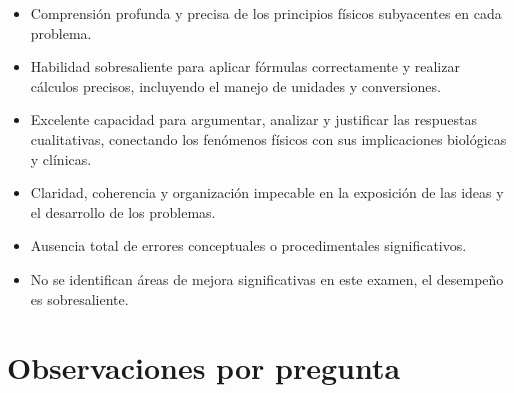\documentclass[11pt,a4paper]{article}
\begin{document}
\vspace{4pt}
\begin{minipage}[t]{0.48\linewidth}
  \begin{tcolorbox}[cajaFortaleza, title={Fortalezas}]
\begin{itemize}[leftmargin=1.5em, itemsep=2pt]
  \item Comprensión profunda y precisa de los principios físicos subyacentes en cada problema.
  \item Habilidad sobresaliente para aplicar fórmulas correctamente y realizar cálculos precisos, incluyendo el manejo de unidades y conversiones.
  \item Excelente capacidad para argumentar, analizar y justificar las respuestas cualitativas, conectando los fenómenos físicos con sus implicaciones biológicas y clínicas.
  \item Claridad, coherencia y organización impecable en la exposición de las ideas y el desarrollo de los problemas.
  \item Ausencia total de errores conceptuales o procedimentales significativos.
\end{itemize}
  \end{tcolorbox}
\end{minipage}
\hfill
\begin{minipage}[t]{0.48\linewidth}
  \begin{tcolorbox}[cajaMejora, title={Areas de mejora}]
\begin{itemize}[leftmargin=1.5em, itemsep=2pt]
  \item No se identifican áreas de mejora significativas en este examen, el desempeño es sobresaliente.
\end{itemize}
  \end{tcolorbox}
\end{minipage}

\section*{Observaciones por pregunta}
\end{document}
